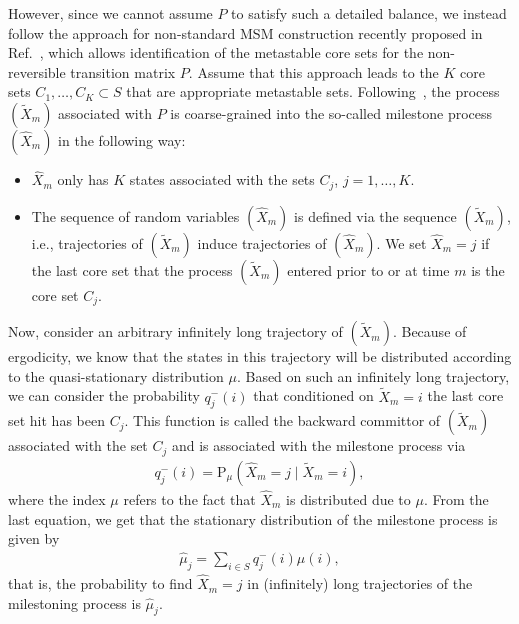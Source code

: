 \documentclass[journal=jctcce,manuscript=article]{achemso}
\newcommand{\bwd}[0]{-}
\newcommand{\prob}{\textrm{P}}
\begin{document}
However, since we cannot assume $P$ to satisfy such a detailed balance, we
instead follow the approach for non-standard MSM construction recently proposed in Ref.~\cite{sarich2014utilizing}, which allows  identification of the metastable core sets for the
non-reversible transition matrix $P$. Assume that this approach leads
to the $K$ core sets $C_1,\ldots, C_K\subset S$ that are appropriate metastable sets. 
Following~\cite{A19-31,schuette2011markov}, the process $(\tilde X_m)$ associated with $P$ is coarse-grained into the so-called milestone process $(\hat{X}_m)$ in the following way: 
\begin{itemize}
\item $\hat{X}_m$ only has $K$ states associated with the sets $C_j$, $j=1,\ldots,K$. 
\item The sequence of random variables $(\hat{X}_m)$ is defined via the sequence $(\tilde X_m)$, i.e., trajectories of $(\tilde X_m)$ induce trajectories of $(\hat{X}_m)$. We set $\hat{X}_m=j$ if the last core set that the process $(\tilde X_m)$ entered prior to or at time $m$ is the core set $C_j$.
\end{itemize}
Now, consider an arbitrary infinitely long trajectory of $(\tilde X_m)$. Because of ergodicity, we know that the states in this trajectory will be distributed according to the quasi-stationary distribution $\mu$. Based on such an infinitely long trajectory, we can consider the probability $q_j^\bwd(i)$ that conditioned on $\tilde X_m=i$ the last core set hit has been $C_j$.
This function is called the backward committor of $(\tilde X_m)$ associated with the set $C_j$ and is associated with the milestone process via
\begin{align}
\label{eq:msm-bwd-committor}  
q^\bwd_j(i)=\prob_\mu(\hat{X}_m=j \mid \tilde X_m=i),
\end{align}
where  the index $\mu$ refers to the fact that $\hat{X}_m$ is distributed due to $\mu$.
From the last equation, we get that the stationary distribution of the milestone process is given by
\begin{align}  
\hat{\mu}_j=\sum_{i\in S} q^\bwd_j(i)\mu(i),
\end{align}
that is, the probability to find $\hat{X}_m=j$ in (infinitely) long trajectories of the milestoning process is $\hat{\mu}_j$.
\end{document}
